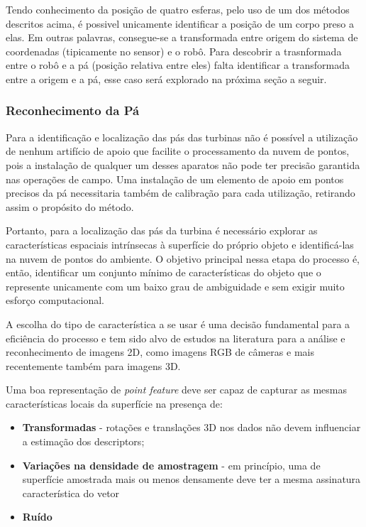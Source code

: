 Tendo conhecimento da posição de quatro esferas, pelo uso de um dos métodos
descritos acima, é possivel unicamente identificar a posição de um corpo preso a
elas. Em outras palavras, consegue-se a transformada entre origem do sistema de
coordenadas (tipicamente no sensor) e o robô. Para descobrir a trasnformada
entre o robô e a pá (posição relativa entre eles) falta identificar a
transformada entre a origem e a pá, esse caso será explorado na próxima seção a
seguir.

\subsubsection{Reconhecimento da Pá} 

Para a identificação e localização das pás das turbinas não é possível a
utilização de nenhum artifício de apoio que facilite o processamento da nuvem de
pontos, pois a instalação de qualquer um desses aparatos não pode ter precisão
garantida nas operações de campo. Uma instalação de um elemento de apoio em
pontos precisos da pá necessitaria também de calibração para cada utilização, retirando assim
o propósito do método. 

Portanto, para a localização das pás da turbina é
necessário explorar as características espaciais intrínsecas à superfície do
próprio objeto e identificá-las na nuvem de pontos do ambiente. O objetivo
principal nessa etapa do processo é, então, identificar um conjunto mínimo de
características do objeto que o represente unicamente com um baixo grau
de ambiguidade e sem exigir muito esforço computacional. 

A escolha do tipo de característica a se usar é uma decisão fundamental para a
eficiência do processo e tem sido alvo de estudos na literatura para a análise
e reconhecimento de imagens 2D, como imagens RGB de câmeras e mais recentemente
também para imagens 3D. 

Uma boa representação de \textit{point feature} deve ser capaz de capturar as
mesmas características locais da superfície na presença de:

\begin{itemize}
  \item \textbf{Transformadas} -  rotações e translações 3D nos dados não devem
  influenciar a estimação dos descriptors;
  \item \textbf{Variações na densidade de amostragem} - em princípio, uma de
  superfície amostrada mais ou menos densamente deve ter a mesma assinatura característica do vetor
  \item \textbf{Ruído}
\end{itemize}

